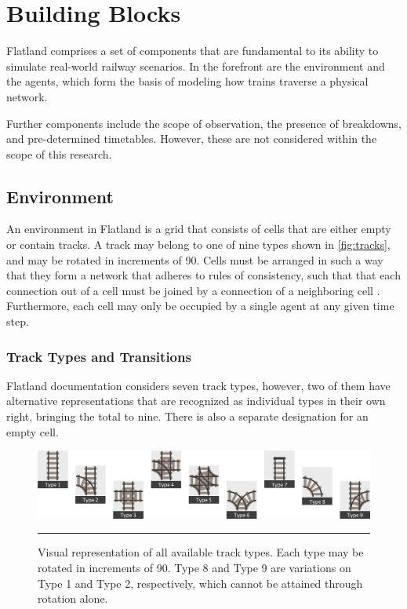 \documentclass[11pt]{article}
\begin{document}
\section{Building Blocks}
Flatland comprises a set of components that are fundamental to its ability to simulate real-world railway scenarios.  In the forefront are the environment and the agents, which form the basis of modeling how trains traverse a physical network.

Further components include the scope of observation, the presence of breakdowns, and pre-determined timetables.  However, these are not considered within the scope of this research.

\subsection{Environment}
\label{sec:Environment}
An environment in Flatland is a grid that consists of cells that are either empty or contain tracks.  A track may belong to one of nine types shown in \autoref{fig:tracks}, and may be rotated in increments of 90\degree.  Cells must be arranged in such a way that they form a network that adheres to rules of consistency, such that that each connection out of a cell must be joined by a connection of a neighboring cell \citep{baeiegljmomonyspwaaggo21a}.  Furthermore, each cell may only be occupied by a single agent at any given time step.

\subsubsection{Track Types and Transitions}
\label{sec:Track}
Flatland documentation \citep{baeiegljmomonyspwaaggo21a} considers seven track types, however, two of them have alternative representations that are recognized as individual types in their own right, bringing the total to nine.  There is also a separate designation for an empty cell.

\begin{figure}[t]
\centering
\includegraphics[width=\textwidth]{tracks}
\caption{Visual representation of all available track types.  Each type may be rotated in increments of 90\degree.  Type 8 and Type 9 are variations on Type 1 and Type 2, respectively, which cannot be attained through rotation alone.}
\label{fig:tracks}

\begin{center}
{\color{lightgray} \rule{\linewidth}{0.15mm}}
\end{center}

\end{figure}
\end{document}
